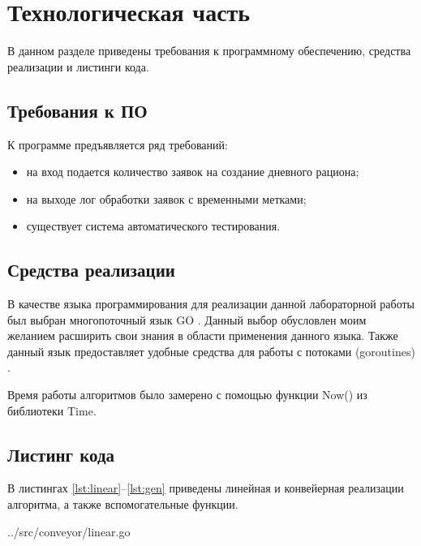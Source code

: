 \chapter{Технологическая часть}

В данном разделе приведены требования к программному обеспечению, средства реализации и листинги кода.

\section{Требования к ПО}

К программе предъявляется ряд требований:
\begin{itemize}
	\item на вход подается количество заявок на создание дневного рациона;
	\item на выходе лог обработки заявок с временными метками;
	\item существует система автоматического тестирования.
\end{itemize}

\section{Средства реализации}

В качестве языка программирования для реализации данной лабораторной работы был выбран многопоточный язык GO \cite{golang}. Данный выбор обусловлен моим желанием расширить свои знания в области применения данного языка. Также данный язык предоставляет удобные средства для работы с потоками (goroutines) \cite{goconc}.
 
Время работы алгоритмов было замерено с помощью функции {\ttfamily Now()}
из библиотеки {\ttfamily Time}.

\section{Листинг кода}

В листингах \ref{lst:linear}--\ref{lst:gen} приведены  линейная и конвейерная реализации алгоритма, а также вспомогательные функции.

\clearpage

\captionsetup{singlelinecheck = false, justification=raggedright}

\begin{lstinputlisting}[
	caption={Линейный алгоритм},
	label={lst:linear},
	style={go},
	linerange={5-42},
	]{../src/conveyor/linear.go}
\end{lstinputlisting}

